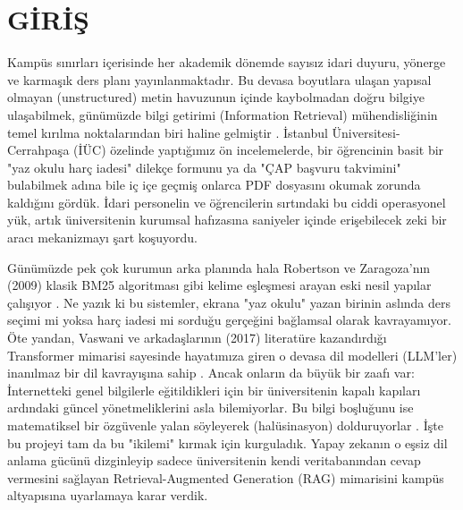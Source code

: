 \documentclass[12pt,a4paper]{report}
\begin{document}
\chapter{GİRİŞ}

Kampüs sınırları içerisinde her akademik dönemde sayısız idari duyuru, yönerge ve karmaşık ders planı yayınlanmaktadır. Bu devasa boyutlara ulaşan yapısal olmayan (unstructured) metin havuzunun içinde kaybolmadan doğru bilgiye ulaşabilmek, günümüzde bilgi getirimi (Information Retrieval) mühendisliğinin temel kırılma noktalarından biri haline gelmiştir \cite{manning2008introduction}. İstanbul Üniversitesi-Cerrahpaşa (İÜC) özelinde yaptığımız ön incelemelerde, bir öğrencinin basit bir "yaz okulu harç iadesi" dilekçe formunu ya da "ÇAP başvuru takvimini" bulabilmek adına bile iç içe geçmiş onlarca PDF dosyasını okumak zorunda kaldığını gördük. İdari personelin ve öğrencilerin sırtındaki bu ciddi operasyonel yük, artık üniversitenin kurumsal hafızasına saniyeler içinde erişebilecek zeki bir aracı mekanizmayı şart koşuyordu.

Günümüzde pek çok kurumun arka planında hala Robertson ve Zaragoza'nın (2009) klasik BM25 algoritması gibi kelime eşleşmesi arayan eski nesil yapılar çalışıyor \cite{robertson2009probabilistic}. Ne yazık ki bu sistemler, ekrana "yaz okulu" yazan birinin aslında ders seçimi mi yoksa harç iadesi mi sorduğu gerçeğini bağlamsal olarak kavrayamıyor. Öte yandan, Vaswani ve arkadaşlarının (2017) literatüre kazandırdığı Transformer mimarisi sayesinde hayatımıza giren o devasa dil modelleri (LLM'ler) inanılmaz bir dil kavrayışına sahip \cite{vaswani2017attention}. Ancak onların da büyük bir zaafı var: İnternetteki genel bilgilerle eğitildikleri için bir üniversitenin kapalı kapıları ardındaki güncel yönetmeliklerini asla bilemiyorlar. Bu bilgi boşluğunu ise matematiksel bir özgüvenle yalan söyleyerek (halüsinasyon) dolduruyorlar \cite{ji2023survey}. İşte bu projeyi tam da bu "ikilemi" kırmak için kurguladık. Yapay zekanın o eşsiz dil anlama gücünü dizginleyip sadece üniversitenin kendi veritabanından cevap vermesini sağlayan Retrieval-Augmented Generation (RAG) mimarisini \cite{lewis2020retrieval} kampüs altyapısına uyarlamaya karar verdik.
\end{document}
